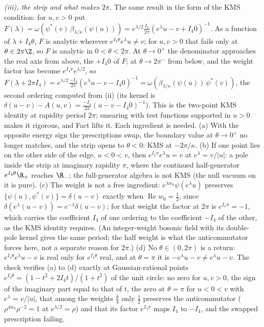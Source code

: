 \emph{(iii), the strip and what makes $2\pi$.} The same result in the form of the KMS condition: for $u, v > 0$ put $F(\lambda) = \omega(\psi^{*}(v)\,\beta_{\lambda/\kappa}(\psi(u))) = e^{\lambda/2}\tfrac{I_{4}}{2\pi}(e^{\lambda}u - v + I_{4}0)^{-1}$. As a function of $\lambda + I_{4}\theta$, $F$ is analytic wherever $e^{I_{4}\theta}e^{\lambda}u \ne v$; for $u, v > 0$ that fails only at $\theta \in 2\pi\Z$, so $F$ is analytic in $0 < \theta < 2\pi$. At $\theta \to 0^{+}$ the denominator approaches the real axis from above, the $+I_{4}0$ of $F$; at $\theta \to 2\pi^{-}$ from below, and the weight factor has become $e^{I_{4}\pi}e^{\lambda/2}$, so $F(\lambda + 2\pi I_{4}) = e^{\lambda/2}\tfrac{-I_{4}}{2\pi}(e^{\lambda}u - v - I_{4}0)^{-1} = \omega(\beta_{\lambda/\kappa}(\psi(u))\,\psi^{*}(v))$, the second ordering computed from (ii) (its kernel is $\delta(u - v) - A(u, v) = \tfrac{-I_{4}}{2\pi}(u - v - I_{4}0)^{-1}$). This is the two-point KMS identity at rapidity period $2\pi$; smearing with test functions supported in $u > 0$ makes it rigorous, and Fact  lifts it. Each ingredient is needed. (a) With the opposite energy sign the prescriptions swap, the boundary value at $\theta \to 0^{+}$ no longer matches, and the strip opens to $\theta < 0$: KMS at $-2\pi/\kappa$. (b) If one point lies on the other side of the edge, $u < 0 < v$, then $e^{I_{4}\pi}e^{\lambda}u = v$ at $e^{\lambda} = v/|u|$: a pole inside the strip at imaginary rapidity $\pi$, where the continued half-generator $e^{I_{4}\theta}\R_{+}$ reaches $\R_{-}$; the full-generator algebra is not KMS (the null vacuum on it is pure). (c) The weight is not a free ingredient: $e^{\lambda w_{0}}\psi(e^{\lambda}u)$ preserves $\{\psi(u), \psi^{*}(v)\} = \delta(u - v)$ exactly when $\operatorname{Re}w_{0} = \tfrac12$, since $\delta(e^{\lambda}(u - v)) = e^{-\lambda}\delta(u - v)$; for that weight the factor at $2\pi$ is $e^{I_{4}\pi} = -1$, which carries the coefficient $I_{4}$ of one ordering to the coefficient $-I_{4}$ of the other, as the KMS identity requires. (An integer-weight bosonic field with its double-pole kernel gives the same period; the half weight is what the anticommutator forces here, not a separate reason for $2\pi$.) (d) No $\theta \in (0, 2\pi)$ is a return: $e^{I_{4}\theta}e^{\lambda}u - v$ is real only for $e^{I_{4}\theta}$ real, and at $\theta = \pi$ it is $-e^{\lambda}u - v \ne e^{\lambda}u - v$. The check verifies (a) to (d) exactly at Gaussian-rational points $e^{I_{4}\theta} = (1 - t^{2} + 2I_{4}t)/(1 + t^{2})$ of the unit circle: no zero for $u, v > 0$, the sign of the imaginary part equal to that of $t$, the zero at $\theta = \pi$ for $u < 0 < v$ with $e^{\lambda} = v/|u|$, that among the weights $\tfrac{k}{4}$ only $\tfrac12$ preserves the anticommutator ($\rho^{4w_{0}}\rho^{-2} = 1$ at $e^{\lambda/2} = \rho$) and that its factor $e^{I_{4}\pi}$ maps $I_{4}$ to $-I_{4}$, and the swapped prescription failing.
